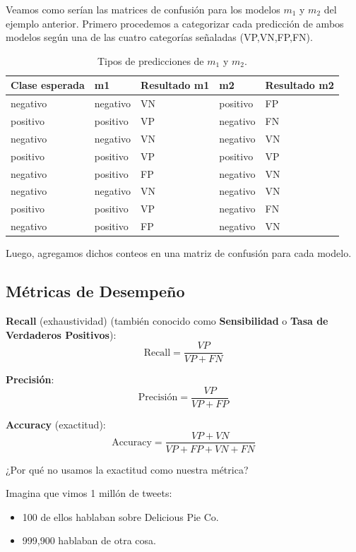 \documentclass[11pt,fleqn]{book} %
\begin{document}
\begin{example}
Veamos como serían las matrices de confusión para los modelos $m_1$ y $m_2$ del ejemplo anterior. Primero procedemos a categorizar cada predicción de ambos modelos según una de las cuatro categorías señaladas (VP,VN,FP,FN). 

\begin{table}[h]
\centering
\begin{tabular}{|l||l|l||l|l|}
\hline
\textbf{Clase esperada} & \textbf{m1} & \textbf{Resultado m1} & \textbf{m2} & \textbf{Resultado m2} \\ \hline
negativo & negativo & VN & positivo & FP \\ \hline
positivo & positivo & VP & negativo & FN \\ \hline
negativo & negativo & VN & negativo & VN \\ \hline
positivo & positivo & VP & positivo & VP \\ \hline
negativo & positivo & FP & negativo & VN \\ \hline
negativo & negativo & VN & negativo & VN \\ \hline
positivo & positivo & VP & negativo & FN \\ \hline
negativo & positivo & FP & negativo & VN \\ \hline
\end{tabular}
\caption{Tipos de predicciones de $m_1$ y $m_2$.}
\label{tab:matriz_confusion}
\end{table}

Luego, agregamos dichos conteos en una matriz de confusión para cada modelo.

\end{example}


\subsection{Métricas de Desempeño}

\textbf{Recall} (exhaustividad) (también conocido como \textbf{Sensibilidad} o \textbf{Tasa de Verdaderos Positivos}):
\[ \text{Recall} = \frac{VP}{VP + FN} \]

\textbf{Precisión}:
\[ \text{Precisión} = \frac{VP}{VP + FP} \]

\textbf{Accuracy} (exactitud):
\[ \text{Accuracy} = \frac{VP + VN}{VP + FP + VN + FN} \]


¿Por qué no usamos la exactitud como nuestra métrica?

Imagina que vimos 1 millón de tweets:
\begin{itemize}
\item 100 de ellos hablaban sobre Delicious Pie Co.
\item 999,900 hablaban de otra cosa.
\end{itemize}
\end{document}
